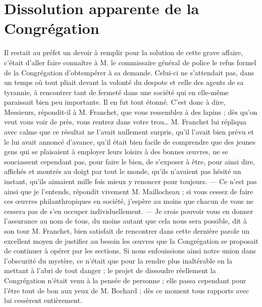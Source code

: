 \section*{Dissolution apparente de la Congrégation}
Il restait au préfet un devoir à remplir pour la solution de cette grave affaire, c'était d'aller faire connaître à M. le commissaire général de police le refus formel de la Congrégation d'obtempérer à sa demande. Celui-ci ne s'attendait pas, dans un temps où tout pliait devant la volonté du despote et celle des agents de sa tyrannie, à rencontrer tant de fermeté dans une société qui en elle-même paraissait bien peu importante. Il en fut tout étonné. C'est donc à dire, Messieurs, répondit-il à M. Franchet, que vous ressemblez à des lapins ; dès qu'on veut vous voir de près, vous rentrez dans votre trou… M. Franchet lui répliqua avec calme que ce résultat ne l'avait nullement surpris, qu'il l'avait bien prévu et le lui avait annoncé d'avance, qu'il était bien facile de comprendre que des jeunes gens qui se plaisaient à employer leurs loisirs à des bonnes œuvres, ne se souciassent cependant pas, pour faire le bien,
de s'exposer à être, pour ainsi dire, affichés et montrés au doigt par tout le monde, qu'ils n'avaient pas hésité un instant, qu'ils aimaient mille fois mieux y renoncer pour toujours. — Ce n'est pas ainsi que je l'entends, répondit vivement M. Maillocheau ; si vous cessez de faire ces œuvres philanthropiques en société, j'espère au moins que chacun de vous ne cessera pas de s'en occuper individuellement. — Je crois pouvoir vous en donner l'assurance au nom de tous, du moins autant que cela nous sera possible, dit à son tour M. Franchet, bien satisfait de rencontrer dans cette dernière parole un excellent moyen de justifier au besoin les œuvres que la Congrégation se proposait de continuer à opérer par les sections. Si nous enfouissions ainsi notre union dans l'obscurité du mystère, ce n'était que pour la rendre plus inaltérable en la mettant à l'abri de tout danger ; le projet de dissoudre réellement la Congrégation n'était venu à la pensée de personne ; elle passa cependant pour l'être tout de bon aux yeux de M. Bochard ; dès ce moment tous rapports avec lui cessèrent entièrement.

